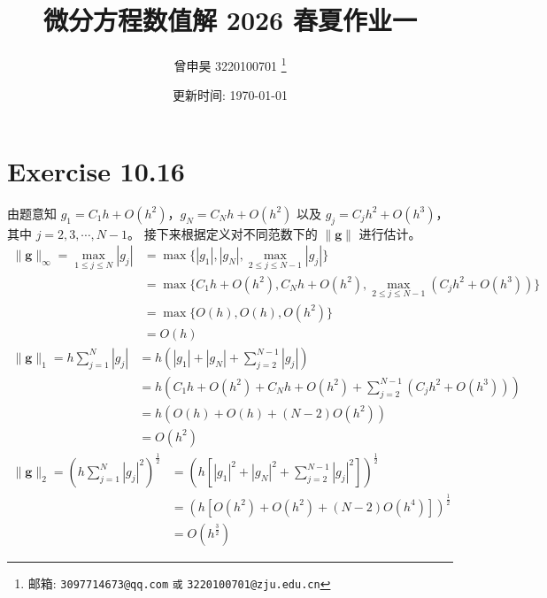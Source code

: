 \documentclass[a4paper]{article}
\begin{document}
\title{微分方程数值解 2026 春夏作业一}

\author{曾申昊 3220100701
  \thanks{邮箱: \texttt{3097714673@qq.com}
                            \texttt{或} \texttt{3220100701@zju.edu.cn}}}

\date{更新时间: \today}

\maketitle

\section*{Exercise 10.16}

\par 由题意知 $g_1=C_1h+O(h^2)$，$g_N=C_Nh+O(h^2)$
以及 $g_j=C_jh^2+O(h^3)$，其中 $j=2,3,\cdots,N-1$。
接下来根据定义对不同范数下的 $\lVert \mathbf{g} \rVert$ 进行估计。
\begin{equation}
    \begin{aligned}
        \lVert \mathbf{g} \rVert_{\infty}
        = \max_{1 \leq j \leq N} |g_j| 
        &= \max \{ |g_1|, |g_N|, \max_{2 \leq j \leq N-1} |g_j| \} \\
        &= \max \{ C_1h+O(h^2), C_Nh+O(h^2), \max_{2 \leq j \leq N-1} (C_jh^2+O(h^3)) \} \\
        &= \max \{ O(h), O(h), O(h^2) \} \\
        &= O(h)
    \end{aligned}
\end{equation}
\begin{equation}
    \begin{aligned}
        \lVert \mathbf{g} \rVert_1
        = h\sum_{j=1}^N |g_j|
        &= h \left( |g_1| + |g_N| + \sum_{j=2}^{N-1} |g_j| \right) \\
        &= h \left( C_1h+O(h^2) + C_Nh+O(h^2) + \sum_{j=2}^{N-1} (C_jh^2+O(h^3)) \right) \\
        &= h \left( O(h) + O(h) + (N-2)O(h^2) \right) \\
        &= O(h^2)
    \end{aligned}
\end{equation}
\begin{equation}
    \begin{aligned}
        \lVert \mathbf{g} \rVert_2
        = \left( h\sum_{j=1}^N |g_j|^2 \right)^{\frac{1}{2}}
        &= \left(h \left[ |g_1|^2 + |g_N|^2 + \sum_{j=2}^{N-1} |g_j|^2 \right]\right)^{\frac{1}{2}} \\
        &= \left( h \left[
            O(h^2)+O(h^2)+(N-2)O(h^4)
        \right] \right)^{\frac{1}{2}} \\
        &= O(h^{\frac{3}{2}})
    \end{aligned}
\end{equation}
\end{document}
